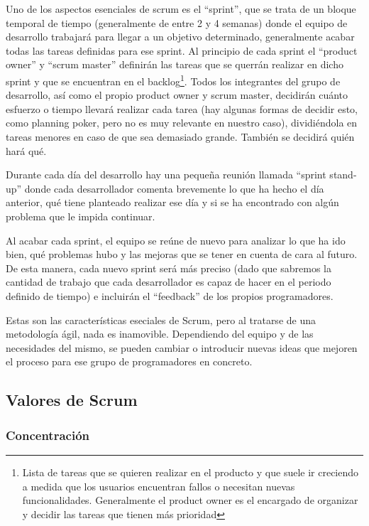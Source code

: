 Uno de los aspectos esenciales de scrum es el ``sprint'', que se trata de un bloque temporal de tiempo (generalmente de entre 2 y 4 semanas) donde el equipo de desarrollo trabajará para llegar a un objetivo determinado, generalmente acabar todas las tareas definidas para ese sprint. 
Al principio de cada sprint  el ``product owner'' y ``scrum master'' definirán las tareas que se querrán realizar en dicho sprint y que se encuentran en el backlog\footnote{Lista de tareas que se quieren realizar en el producto y que suele ir creciendo a medida que los usuarios encuentran fallos o necesitan nuevas funcionalidades. Generalmente el product owner es el encargado de organizar y decidir las tareas que tienen más prioridad}. Todos los integrantes del grupo de desarrollo, así como el propio product owner y scrum master, decidirán cuánto esfuerzo o tiempo llevará realizar cada tarea (hay algunas formas de decidir esto, como planning poker, pero no es muy relevante en nuestro caso), dividiéndola en tareas menores en caso de que sea demasiado grande. También se decidirá quién hará qué.

Durante cada día del desarrollo hay una pequeña reunión llamada ``sprint stand-up'' donde cada desarrollador comenta brevemente lo que ha hecho el día anterior, qué tiene planteado realizar ese día y si se ha encontrado con algún problema que le impida continuar.

Al acabar cada sprint, el equipo se reúne de nuevo para analizar lo que ha ido bien, qué problemas hubo y las mejoras que se tener en cuenta de cara al futuro. De esta manera, cada nuevo sprint será más preciso (dado que sabremos la cantidad de trabajo que cada desarrollador es capaz de hacer en el periodo definido de tiempo) e incluirán el ``feedback'' de los propios programadores.

Estas son las características eseciales de Scrum, pero al tratarse de una metodología ágil, nada es inamovible. Dependiendo del equipo y de las necesidades del mismo, se pueden cambiar o introducir nuevas ideas que mejoren el proceso para ese grupo de programadores en concreto.

\subsection{Valores de Scrum}

\subsubsection{Concentración}


